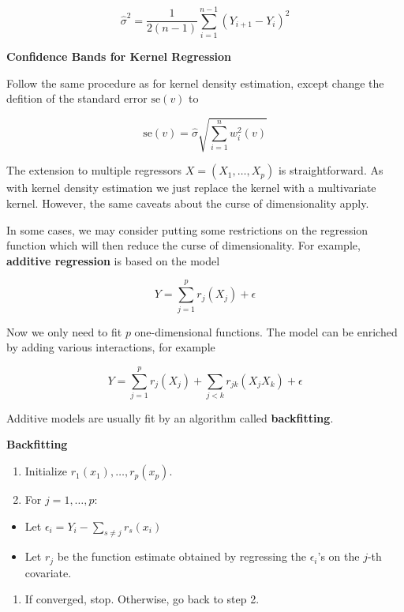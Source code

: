 \[ \hat{\sigma}^2 = \frac{1}{2(n - 1)} \sum_{i=1}^{n-1} (Y_{i+1} - Y_i)^2\]

\textbf{Confidence Bands for Kernel Regression}

Follow the same procedure as for kernel density estimation, except
change the defition of the standard error \(\text{se}(v)\) to

\[ \text{se}(v) = \hat{\sigma} \sqrt{\sum_{i=1}^n w^2_i(v)} \]

The extension to multiple regressors \(X = (X_1, \dots, X_p)\) is
straightforward. As with kernel density estimation we just replace the
kernel with a multivariate kernel. However, the same caveats about the
curse of dimensionality apply.

In some cases, we may consider putting some restrictions on the
regression function which will then reduce the curse of dimensionality.
For example, \textbf{additive regression} is based on the model

\[ Y = \sum_{j=1}^p r_j(X_j) + \epsilon\]

Now we only need to fit \(p\) one-dimensional functions. The model can
be enriched by adding various interactions, for example

\[ Y = \sum_{j=1}^p r_j(X_j) + \sum_{j < k} r_{jk}(X_j X_k) + \epsilon\]

Additive models are usually fit by an algorithm called
\textbf{backfitting}.

\textbf{Backfitting}

\begin{enumerate}[tightlist,label={\arabic*.}]
\item
  Initialize \(r_1(x_1), \dots, r_p(x_p)\).
\item
  For \(j = 1, \dots, p\):
\end{enumerate}

\begin{itemize}[tightlist]
\item
  Let \(\epsilon_i = Y_i - \sum_{s \neq j} r_s(x_i)\)\\
\item
  Let \(r_j\) be the function estimate obtained by regressing the
  \(\epsilon_i\)'s on the \(j\)-th covariate.
\end{itemize}

\begin{enumerate}[tightlist,label={\arabic*.},resume]
\item
  If converged, stop. Otherwise, go back to step 2.
\end{enumerate}

